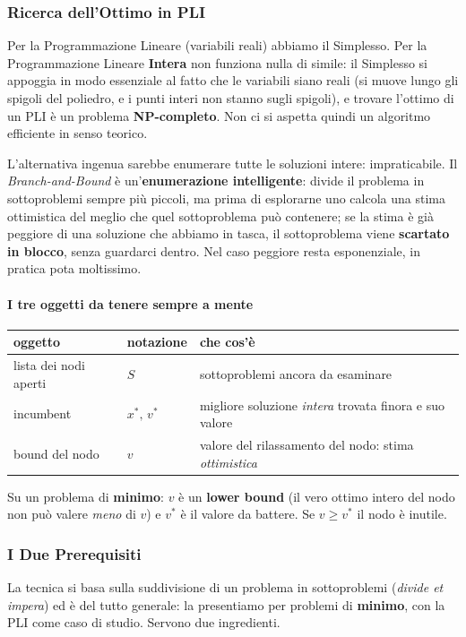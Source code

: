 \documentclass[12pt]{extarticle} %
\begin{document}
\subsubsection{Ricerca dell'Ottimo in PLI}
Per la Programmazione Lineare (variabili reali) abbiamo il Simplesso. Per la Programmazione Lineare \textbf{Intera} non funziona nulla di simile: il Simplesso si appoggia in modo essenziale al fatto che le variabili siano reali (si muove lungo gli spigoli del poliedro, e i punti interi non stanno sugli spigoli), e trovare l'ottimo di un PLI è un problema \textbf{NP-completo}. Non ci si aspetta quindi un algoritmo efficiente in senso teorico.

\noindent L'alternativa ingenua sarebbe enumerare tutte le soluzioni intere: impraticabile. Il \textit{Branch-and-Bound} è un'\textbf{enumerazione intelligente}: divide il problema in sottoproblemi sempre più piccoli, ma prima di esplorarne uno calcola una stima ottimistica del meglio che quel sottoproblema può contenere; se la stima è già peggiore di una soluzione che abbiamo in tasca, il sottoproblema viene \textbf{scartato in blocco}, senza guardarci dentro. Nel caso peggiore resta esponenziale, in pratica pota moltissimo.

\paragraph{I tre oggetti da tenere sempre a mente}
\begin{center}
\begin{tabular}{lll}
\hline
\textbf{oggetto} & \textbf{notazione} & \textbf{che cos'è} \\
\hline
lista dei nodi aperti & $S$ & sottoproblemi ancora da esaminare \\
incumbent & $x^*,\,v^*$ & migliore soluzione \emph{intera} trovata finora e suo valore \\
bound del nodo & $v$ & valore del rilassamento del nodo: stima \emph{ottimistica} \\
\hline
\end{tabular}
\end{center}
Su un problema di \textbf{minimo}: $v$ è un \textbf{lower bound} (il vero ottimo intero del nodo non può valere \emph{meno} di $v$) e $v^*$ è il valore da battere. Se $v \ge v^*$ il nodo è inutile.

\subsubsection{I Due Prerequisiti}
La tecnica si basa sulla suddivisione di un problema in sottoproblemi (\textit{divide et impera}) ed è del tutto generale: la presentiamo per problemi di \textbf{minimo}, con la PLI come caso di studio. Servono due ingredienti.
\end{document}
